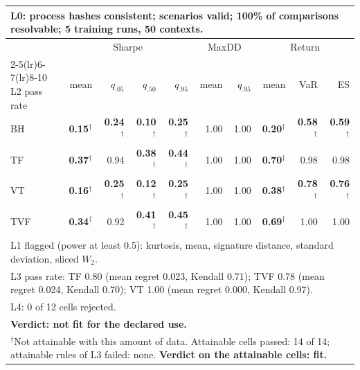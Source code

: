 \begin{tabular}{lrrrrrrrrr}
\toprule
\multicolumn{10}{p{13.5cm}}{L0: process hashes consistent; scenarios valid; 100\% of comparisons resolvable; 5 training runs, 50 contexts.} \\
\midrule
 & \multicolumn{4}{c}{Sharpe} & \multicolumn{2}{c}{MaxDD} & \multicolumn{3}{c}{Return} \\
\cmidrule(lr){2-5}\cmidrule(lr){6-7}\cmidrule(lr){8-10}
L2 pass rate & mean & $q_{.05}$ & $q_{.50}$ & $q_{.95}$ & mean & $q_{.95}$ & mean & VaR & ES \\
\midrule
BH & \textbf{0.15}$^{\dagger}$ & \textbf{0.24}$^{\dagger}$ & \textbf{0.10}$^{\dagger}$ & \textbf{0.25}$^{\dagger}$ & 1.00 & 1.00 & \textbf{0.20}$^{\dagger}$ & \textbf{0.58}$^{\dagger}$ & \textbf{0.59}$^{\dagger}$ \\
TF & \textbf{0.37}$^{\dagger}$ & 0.94 & \textbf{0.38}$^{\dagger}$ & \textbf{0.44}$^{\dagger}$ & 1.00 & 1.00 & \textbf{0.70}$^{\dagger}$ & 0.98 & 0.98 \\
VT & \textbf{0.16}$^{\dagger}$ & \textbf{0.25}$^{\dagger}$ & \textbf{0.12}$^{\dagger}$ & \textbf{0.25}$^{\dagger}$ & 1.00 & 1.00 & \textbf{0.38}$^{\dagger}$ & \textbf{0.78}$^{\dagger}$ & \textbf{0.76}$^{\dagger}$ \\
TVF & \textbf{0.34}$^{\dagger}$ & 0.92 & \textbf{0.41}$^{\dagger}$ & \textbf{0.45}$^{\dagger}$ & 1.00 & 1.00 & \textbf{0.69}$^{\dagger}$ & 1.00 & 1.00 \\
\midrule
\multicolumn{10}{p{13.5cm}}{L1 flagged (power at least 0.5): kurtosis, mean, signature distance, standard deviation, sliced $W_2$.} \\
\multicolumn{10}{p{13.5cm}}{L3 pass rate: TF 0.80 (mean regret 0.023, Kendall 0.71); TVF 0.78 (mean regret 0.024, Kendall 0.70); VT 1.00 (mean regret 0.000, Kendall 0.97).} \\
\multicolumn{10}{p{13.5cm}}{L4: 0 of 12 cells rejected.} \\
\multicolumn{10}{p{13.5cm}}{\textbf{Verdict: not fit for the declared use.}} \\
\multicolumn{10}{p{13.5cm}}{$^{\dagger}$Not attainable with this amount of data. Attainable cells passed: 14 of 14; attainable rules of L3 failed: none. \textbf{Verdict on the attainable cells: fit.}} \\
\bottomrule
\end{tabular}
